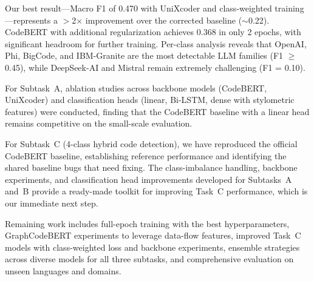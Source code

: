 \documentclass[11pt]{article}
\begin{document}
Our best result---Macro F1 of 0.470 with UniXcoder and class-weighted training---represents a $>$2$\times$ improvement over the corrected baseline ($\sim$0.22). CodeBERT with additional regularization achieves 0.368 in only 2 epochs, with significant headroom for further training. Per-class analysis reveals that OpenAI, Phi, BigCode, and IBM-Granite are the most detectable LLM families (F1 $\geq$ 0.45), while DeepSeek-AI and Mistral remain extremely challenging (F1 = 0.10).

For Subtask~A, ablation studies across backbone models (CodeBERT, UniXcoder) and classification heads (linear, Bi-LSTM, dense with stylometric features) were conducted, finding that the CodeBERT baseline with a linear head remains competitive on the small-scale evaluation.

For Subtask~C (4-class hybrid code detection), we have reproduced the official CodeBERT baseline, establishing reference performance and identifying the shared baseline bugs that need fixing. The class-imbalance handling, backbone experiments, and classification head improvements developed for Subtasks~A and~B provide a ready-made toolkit for improving Task~C performance, which is our immediate next step.

Remaining work includes full-epoch training with the best hyperparameters, GraphCodeBERT experiments to leverage data-flow features, improved Task~C models with class-weighted loss and backbone experiments, ensemble strategies across diverse models for all three subtasks, and comprehensive evaluation on unseen languages and domains.

\newpage
\nocite{*}



%

\end{document}
